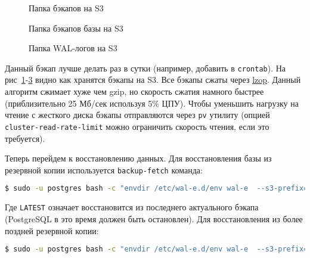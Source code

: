 \begin{figure}[h!]
  \caption{Папка бэкапов на S3}
  \label{fig:wal-e1}
\end{figure}

\begin{figure}[h!]
  \caption{Папка бэкапов базы на S3}
  \label{fig:wal-e2}
\end{figure}

\begin{figure}[h!]
  \caption{Папка WAL-логов на S3}
  \label{fig:wal-e3}
\end{figure}

Данный бэкап лучше делать раз в сутки (например, добавить в \lstinline!crontab!). На рис~\ref{fig:wal-e1}-\ref{fig:wal-e3} видно как хранятся бэкапы на S3. Все бэкапы сжаты через \href{http://en.wikipedia.org/wiki/Lzop}{lzop}. Данный алгоритм сжимает хуже чем gzip, но скорость сжатия намного быстрее (приблизительно 25 Мб/сек используя 5\% ЦПУ). Чтобы уменьшить нагрузку на чтение с жесткого диска бэкапы отправляются через \lstinline!pv! утилиту (опцией \lstinline!cluster-read-rate-limit! можно ограничить скорость чтения, если это требуется).

Теперь перейдем к восстановлению данных. Для восстановления базы из резервной копии используется \lstinline!backup-fetch! команда:

\begin{lstlisting}[language=Bash,label=lst:wal-e10,caption=Восстановление бэкапа базы из S3]
$ sudo -u postgres bash -c "envdir /etc/wal-e.d/env wal-e  --s3-prefix=s3://some-bucket/directory/or/whatever backup-fetch /var/lib/postgresql/9.2/main LATEST"
\end{lstlisting}

Где \lstinline!LATEST! означает восстановится из последнего актуального бэкапа (PostgreSQL в это время должен быть остановлен). Для восстановления из более поздней резервной копии:

\begin{lstlisting}[language=Bash,label=lst:wal-e11,caption=Восстановление из поздней резервной копии]
$ sudo -u postgres bash -c "envdir /etc/wal-e.d/env wal-e  --s3-prefix=s3://some-bucket/directory/or/whatever backup-fetch /var/lib/postgresql/9.2/main base_LONGWALNUMBER_POSITION_NUMBER"
\end{lstlisting}

